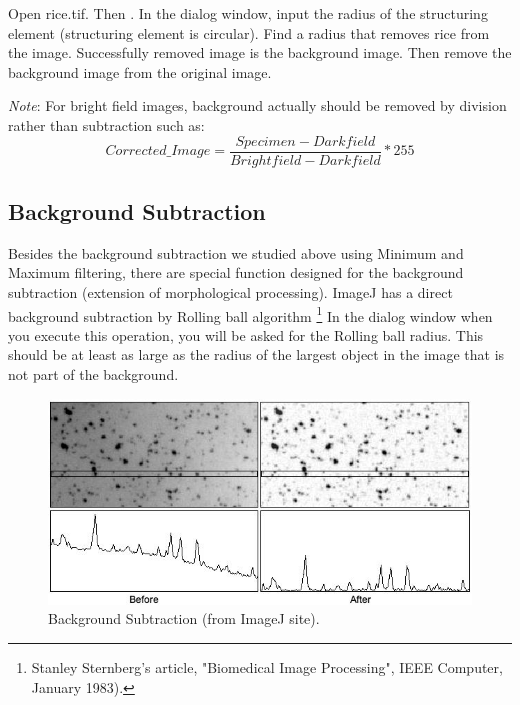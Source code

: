 \begin{indentexercise}{1}
\label{exer:removerice}
Open rice.tif. Then . In the dialog
window, input the radius of the structuring element (structuring
element is circular). Find a radius that removes rice from the image.
Successfully removed image is the background image. Then remove the
background image from the original image. 

\textit{Note}: For bright field images, background actually should
be removed by division rather than subtraction such as: 
\[
Corrected\_Image = \frac{Specimen - Darkfield}{Brightfield - Darkfield} * 255
\]
\end{indentexercise}



\subsection{Background Subtraction}

Besides the background subtraction we studied above using Minimum and
Maximum filtering, there are special function designed for the
background subtraction (extension of morphological processing). ImageJ
has a direct background subtraction by Rolling ball algorithm \footnote{
Stanley Sternberg's article, "Biomedical Image Processing", IEEE Computer, January 1983). }
In the dialog window when you execute this operation, you will be asked for
the Rolling ball radius. This should be at least as large as
the radius of the largest object in the image that is not part of the
background.

\begin{figure}[htbp]
\begin{center}
\includegraphics[width=11.875cm]{fig/CMCIBasicCourse201102-img69.jpg}
\caption{ Background Subtraction (from ImageJ site).}
\label{fig:img69}
\end{center}
\end{figure}


